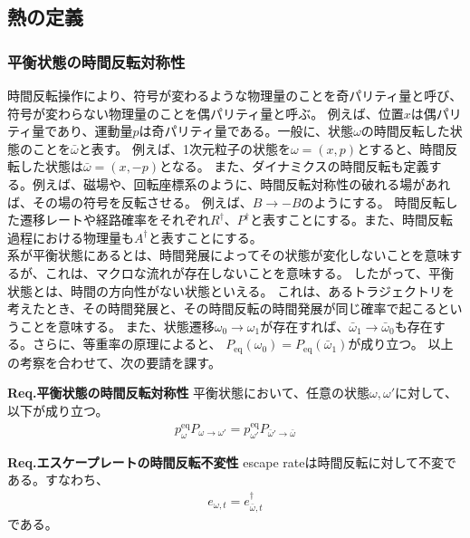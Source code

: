 \documentclass[a4paper,11pt]{jsarticle}
\numberwithin{equation}{section}
\begin{document}
\newpage
\subsection{熱の定義}
\subsubsection{平衡状態の時間反転対称性}
時間反転操作により、符号が変わるような物理量のことを奇パリティ量と呼び、符号が変わらない物理量のことを偶パリティ量と呼ぶ。
例えば、位置$x$は偶パリティ量であり、運動量$p$は奇パリティ量である。一般に、状態$\omega$の時間反転した状態のことを$\bar{\omega}$と表す。
例えば、1次元粒子の状態を$\omega = (x,p)$とすると、時間反転した状態は$\bar{\omega} = (x,-p)$となる。
また、ダイナミクスの時間反転も定義する。例えば、磁場や、回転座標系のように、時間反転対称性の破れる場があれば、その場の符号を反転させる。
例えば、$B \to -B$のようにする。
時間反転した遷移レートや経路確率をそれぞれ$R^{\dagger}$、$P^{\dagger}$と表すことにする。また、時間反転過程における物理量も$A^{\dagger}$と表すことにする。\\

系が平衡状態にあるとは、時間発展によってその状態が変化しないことを意味するが、これは、マクロな流れが存在しないことを意味する。
したがって、平衡状態とは、時間の方向性がない状態といえる。
これは、あるトラジェクトリを考えたとき、その時間発展と、その時間反転の時間発展が同じ確率で起こるということを意味する。
また、状態遷移$\omega_0 \to \omega_1$が存在すれば、$\bar{\omega}_1 \to \bar{\omega}_0$も存在する。さらに、等重率の原理によると、
$P_{\text{eq}}(\omega_0) = P_{\text{eq}}(\bar{\omega}_1)$が成り立つ。
以上の考察を合わせて、次の要請を課す。

\begin{itembox}[l]{\textbf{Req.平衡状態の時間反転対称性}}
    平衡状態において、任意の状態$\omega,\omega'$に対して、以下が成り立つ。
    \begin{align}
        p_{\omega}^{\text{eq}} P_{\omega \to \omega'} = p_{\omega'}^{\text{eq}} P_{\bar{\omega}' \to \bar{\omega}}
    \end{align}

\end{itembox}

\begin{itembox}[l]{\textbf{Req.エスケープレートの時間反転不変性}}
    escape rateは時間反転に対して不変である。すなわち、
    \begin{align}
      e_{\omega,t} = e_{\bar{\omega},t}^{\dagger}
    \end{align}
    である。
\end{itembox}
\end{document}
